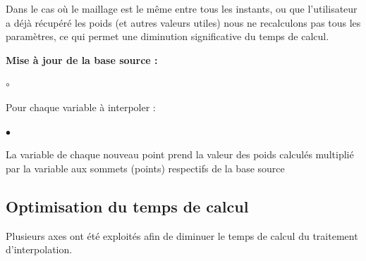 \vspace{0.5cm}

\noindent Dans le cas où le maillage est le même entre tous les instants, ou que l'utilisateur a déjà récupéré les poids (et autres valeurs utiles) nous ne recalculons pas tous les paramètres, ce qui permet une diminution significative du temps de calcul.

\vspace{0.5cm}

\textbf{Mise à jour de la base source :}
\begin{list}{$\circ$}{\leftmargin=0.5cm  \itemsep=0cm}
    \item Pour chaque variable à interpoler :
    \begin{list}{$\bullet$}{\leftmargin=0.5cm  \itemsep=0cm}
        \item La variable de chaque nouveau point prend la valeur des poids calculés multiplié par la variable aux sommets (points) respectifs de la base source
    \end{list}
\end{list}




\subsection{Optimisation du temps de calcul}

Plusieurs axes ont été exploités afin de diminuer le temps de calcul du traitement d'interpolation.

